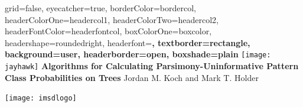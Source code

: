 \documentclass[a0paper,landscape]{baposter}
\begin{document}

\background{
}

\begin{poster}{
	grid=false,
	eyecatcher=true, 
	borderColor=bordercol,
	headerColorOne=headercol1,
	headerColorTwo=headercol2,
	headerFontColor=headerfontcol,
	boxColorOne=boxcolor,
	headershape=roundedright,
	headerfont=\Large\sf\bf,
	textborder=rectangle,
	background=user,
	headerborder=open,
  boxshade=plain
}
{
\texttt{[image: jayhawk]}
}
{\bf
	Algorithms for Calculating Parsimony-Uninformative Pattern Class Probabilities on Trees
}
{
	\vspace{0em} Jordan M. Koch and Mark T. Holder\\
}
{

\setlength\fboxsep{0pt}
\setlength\fboxrule{0.5pt}
			\texttt{[image: imsdlogo]}
}


\end{poster}
\end{document}
